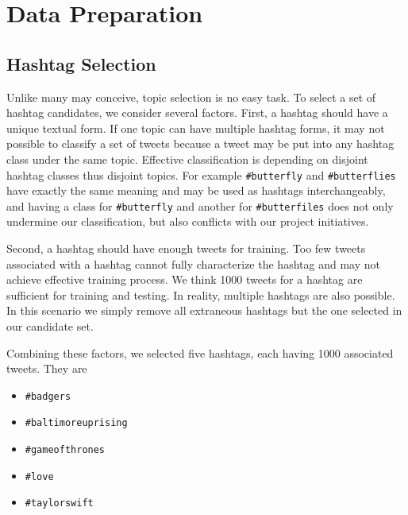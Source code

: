 \documentclass[letterpaper,11pt,twocolumn]{article}
\begin{document}
\section{Data Preparation}
\label{sec:data}

\subsection{Hashtag Selection}
Unlike many may conceive, topic selection is no easy task. To select a set of hashtag candidates, we consider several factors. First, a hashtag should have a unique textual form. If one topic can have multiple hashtag forms, it may not possible to classify a set of tweets because a tweet may be put into any hashtag class under the same topic. Effective classification is depending on disjoint hashtag classes thus disjoint topics. For example \texttt{\#butterfly} and \texttt{\#butterflies} have exactly the same meaning and may be used as hashtags interchangeably, and having a class for \texttt{\#butterfly} and another for \texttt{\#butterfiles} does not only undermine our classification, but also conflicts with our project initiatives.

Second, a hashtag should have enough tweets for training. Too few tweets associated with a hashtag cannot fully characterize the hashtag and may not achieve effective training process. We think 1000 tweets for a hashtag are sufficient for training and testing. In reality, multiple hashtags are also possible. In this scenario we simply remove all extraneous hashtags but the one selected in our candidate set.

Combining these factors, we selected five hashtags, each having 1000 associated tweets. They are
\begin{itemize}
\item
\texttt{\#badgers}
\item
\texttt{\#baltimoreuprising}
\item
\texttt{\#gameofthrones}
\item
\texttt{\#love}
\item
\texttt{\#taylorswift}
\end{itemize}
\end{document}

